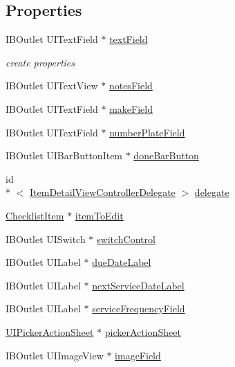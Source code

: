 \subsection*{Properties}
\begin{DoxyCompactItemize}
\item 
I\-B\-Outlet U\-I\-Text\-Field $\ast$ \hyperlink{interface_item_detail_view_controller_a178790ef36e700ef0735d92a3fdd5777}{text\-Field}
\begin{DoxyCompactList}\small\item\em create properties \end{DoxyCompactList}\item 
I\-B\-Outlet U\-I\-Text\-View $\ast$ \hyperlink{interface_item_detail_view_controller_a80dc487dbab30e853134e8bef4503192}{notes\-Field}
\item 
I\-B\-Outlet U\-I\-Text\-Field $\ast$ \hyperlink{interface_item_detail_view_controller_a91462be5eb1862e28a3cea771d2cf7b6}{make\-Field}
\item 
I\-B\-Outlet U\-I\-Text\-Field $\ast$ \hyperlink{interface_item_detail_view_controller_a6681c67331d43060aad7c9d35248a646}{number\-Plate\-Field}
\item 
I\-B\-Outlet U\-I\-Bar\-Button\-Item $\ast$ \hyperlink{interface_item_detail_view_controller_a51351cd76f2e2c1d0ed3075e191a5f2f}{done\-Bar\-Button}
\item 
id\\*
$<$ \hyperlink{protocol_item_detail_view_controller_delegate-p}{Item\-Detail\-View\-Controller\-Delegate} $>$ \hyperlink{interface_item_detail_view_controller_ae9c5ccea3662c42762ebea34efb210a4}{delegate}
\item 
\hyperlink{interface_checklist_item}{Checklist\-Item} $\ast$ \hyperlink{interface_item_detail_view_controller_a0c18d4e6c36c06948dca5a76223896b7}{item\-To\-Edit}
\item 
I\-B\-Outlet U\-I\-Switch $\ast$ \hyperlink{interface_item_detail_view_controller_ad52095ddda5617b558ad17a0d812fde2}{switch\-Control}
\item 
I\-B\-Outlet U\-I\-Label $\ast$ \hyperlink{interface_item_detail_view_controller_ac5b2da2282bfc3b13d40a0c143c82799}{due\-Date\-Label}
\item 
I\-B\-Outlet U\-I\-Label $\ast$ \hyperlink{interface_item_detail_view_controller_aef897ee6e71d9bf075fd3e6693ac1750}{next\-Service\-Date\-Label}
\item 
I\-B\-Outlet U\-I\-Label $\ast$ \hyperlink{interface_item_detail_view_controller_ab7f0c8472790cd52c0a9375f10837228}{service\-Frequency\-Field}
\item 
\hyperlink{interface_u_i_picker_action_sheet}{U\-I\-Picker\-Action\-Sheet} $\ast$ \hyperlink{interface_item_detail_view_controller_ad96011d0f826d53554f9c0c6c2cc603e}{picker\-Action\-Sheet}
\item 
I\-B\-Outlet U\-I\-Image\-View $\ast$ \hyperlink{interface_item_detail_view_controller_ae3b752dab2cb58398896d2885d8f82c4}{image\-Field}
\end{DoxyCompactItemize}



